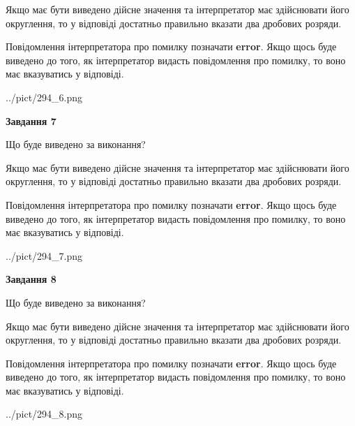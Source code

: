 \documentclass[12pt, ukrainian]{article}
\begin{document}
{\begin {Large}
Якщо має бути виведено дійсне значення та інтерпретатор має здійснювати його округлення, 
то у відповіді достатньо правильно вказати два дробових розряди.

Повідомлення інтерпретатора про помилку позначати \textbf{error}.
Якщо щось буде виведено до того, як інтерпретатор видасть повідомлення про помилку, 
то воно має вказуватись у відповіді. \par

\begin{center}
	{../pict/294_6.png}
\end{center}
\newpage

{\begin {center}\textbf{Завдання 7}\end {center}}\par
Що буде виведено за виконання? \par

Якщо має бути виведено дійсне значення та інтерпретатор має здійснювати його округлення, 
то у відповіді достатньо правильно вказати два дробових розряди.

Повідомлення інтерпретатора про помилку позначати \textbf{error}.
Якщо щось буде виведено до того, як інтерпретатор видасть повідомлення про помилку, 
то воно має вказуватись у відповіді. \par

\begin{center}
	{../pict/294_7.png}
\end{center}
\newpage

{\begin {center}\textbf{Завдання 8}\end {center}}\par
Що буде виведено за виконання? \par

Якщо має бути виведено дійсне значення та інтерпретатор має здійснювати його округлення, 
то у відповіді достатньо правильно вказати два дробових розряди.

Повідомлення інтерпретатора про помилку позначати \textbf{error}.
Якщо щось буде виведено до того, як інтерпретатор видасть повідомлення про помилку, 
то воно має вказуватись у відповіді. \par

\begin{center}
	{../pict/294_8.png}
\end{center}
\newpage


\end{Large}}
\end{document}

